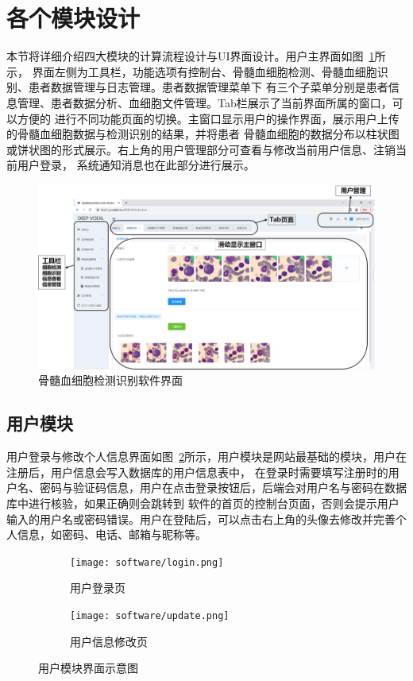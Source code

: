\section{各个模块设计}
本节将详细介绍四大模块的计算流程设计与UI界面设计。用户主界面如图~\ref{fig:interface}所示，
界面左侧为工具栏，功能选项有控制台、骨髓血细胞检测、骨髓血细胞识别、患者数据管理与日志管理。患者数据管理菜单下
有三个子菜单分别是患者信息管理、患者数据分析、血细胞文件管理。Tab栏展示了当前界面所属的窗口，可以方便的
进行不同功能页面的切换。主窗口显示用户的操作界面，展示用户上传的骨髓血细胞数据与检测识别的结果，并将患者
骨髓血细胞的数据分布以柱状图或饼状图的形式展示。右上角的用户管理部分可查看与修改当前用户信息、注销当前用户登录，
系统通知消息也在此部分进行展示。
\begin{figure}[htbp]                     
  \centering                      
  \includegraphics[width=0.99\linewidth]{software.jpg}                      
  \caption{骨髓血细胞检测识别软件界面}                      
  \label{fig:interface}       
\end{figure}
\subsection{用户模块}
用户登录与修改个人信息界面如图~\ref{fig:software_user}所示，用户模块是网站最基础的模块，用户在注册后，用户信息会写入数据库的用户信息表中，
在登录时需要填写注册时的用户名、密码与验证码信息，用户在点击登录按钮后，后端会对用户名与密码在数据库中进行核验，如果正确则会跳转到
软件的首页的控制台页面，否则会提示用户输入的用户名或密码错误。用户在登陆后，可以点击右上角的头像去修改并完善个人信息，如密码、电话、邮箱与昵称等。
\begin{figure}[htbp]
	\centering
	\begin{subfigure}{0.45\linewidth}
		\centering
		\texttt{[image: software/login.png]}
    \caption{用户登录页}
	\end{subfigure}
	\centering
	\begin{subfigure}{0.45\linewidth}
		\centering
		\texttt{[image: software/update.png]}
    \caption{用户信息修改页}
	\end{subfigure}
  \caption{用户模块界面示意图}
	\label{fig:software_user}
\end{figure}

